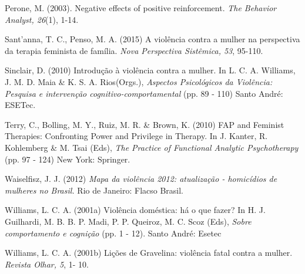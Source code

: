 \hangindent=25pt
\noindent Perone, M. (2003). Negative effects of positive reinforcement. \textit{The Behavior Analyst, 26}(1), 1-14.

\hangindent=25pt
\noindent Sant’anna, T. C., Penso, M. A. (2015) A violência contra a mulher na perspectiva da terapia feminista de família. \textit{Nova Perspectiva Sistêmica, 53}, 95-110.

\hangindent=25pt
\noindent Sinclair, D. (2010) Introdução à violência contra a mulher. In L. C. A. Williams, J. M. D. Maia \& K. S. A. Rios(Orgs.), \textit{Aspectos Psicológicos da Violência: Pesquisa e intervenção cognitivo-comportamental} (pp. 89 - 110) Santo André: ESETec.

\hangindent=25pt
\noindent Terry, C., Bolling, M. Y., Ruiz, M. R. \& Brown, K. (2010) FAP and Feminist Therapies: Confronting Power and Privilege in Therapy. In J. Kanter, R. Kohlemberg \& M. Tsai (Eds), \textit{The Practice of Functional Analytic Psychotherapy} (pp. 97 - 124) New York: Springer.

\hangindent=25pt
\noindent Waiselfisz, J. J. (2012) \textit{Mapa da violência 2012: atualização - homicídios de mulheres no Brasil.} Rio de Janeiro: Flacso Brasil.

\hangindent=25pt
\noindent Williams, L. C. A. (2001a) Violência doméstica: há o que fazer? In H. J. Guilhardi, M. B. B. P. Madi, P. P. Queiroz, M. C. Scoz (Eds), \textit{Sobre comportamento e cognição} (pp. 1 - 12). Santo André: Esetec

\hangindent=25pt
\noindent Williams, L. C. A. (2001b) Lições de Gravelina: violência fatal contra a mulher. \textit{Revista Olhar, 5}, 1- 10.